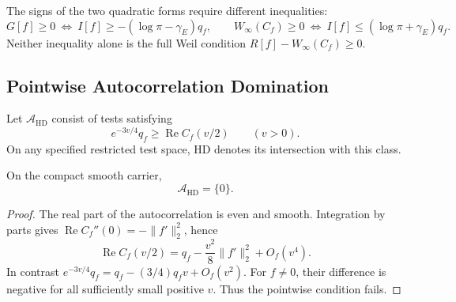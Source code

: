 \begin{remark}
\label{v4-arith:w7-f:rem:laplace-content}
The signs of the two quadratic forms require different inequalities:
\begin{equation}
\label{v4-arith:w7-f:eq:laplace-positivity-sufficient}
 G[f]\ge0\ \Longleftrightarrow\ I[f]\ge-(\log\pi-\gamma_E)q_f,
 \qquad
 W_\infty(C_f)\ge0\ \Longleftrightarrow\ I[f]\le(\log\pi+\gamma_E)q_f.
\end{equation}
Neither inequality alone is the full Weil condition
\(R[f]-W_\infty(C_f)\ge0\).
\end{remark}

\subsection{Pointwise Autocorrelation Domination}
\label{v4-arith:w7-f:hankel:subclass}
\begin{definition}
\label{v4-arith:w7-f:def:hankel-dominance}
Let \(\mathscr A_{\mathrm{HD}}\) consist of tests satisfying
\begin{equation}
\label{v4-arith:w7-f:eq:HD-condition}
 e^{-3v/4}q_f\ge\operatorname{Re}C_f(v/2)\qquad(v>0).
\end{equation}
On any specified restricted test space, HD denotes its intersection
with this class.
\end{definition}
\begin{theorem}
\label{v4-arith:w7-f:thm:HD-ATP}
On the compact smooth carrier,
\begin{equation}
\label{v4-arith:w7-f:eq:HD-conclusion}
 \mathscr A_{\mathrm{HD}}=\{0\}.
\end{equation}
\end{theorem}
\begin{proof}
The real part of the autocorrelation is even and smooth. Integration
by parts gives
\(\operatorname{Re}C_f''(0)=-\|f'\|_2^2\), hence
\[
 \operatorname{Re}C_f(v/2)=q_f-\frac{v^2}{8}\|f'\|_2^2+O_f(v^4).
\]
In contrast \(e^{-3v/4}q_f=q_f-(3/4)q_fv+O_f(v^2)\).
For \(f\ne0\), their difference is negative for all sufficiently
small positive \(v\). Thus the pointwise condition fails.
\end{proof}

